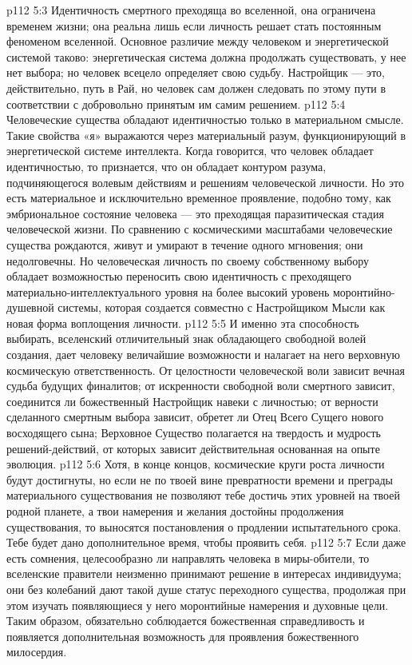 \vs p112 5:3 \pc Идентичность смертного преходяща во вселенной, она ограничена временем жизни; она реальна лишь если личность решает стать постоянным феноменом вселенной. Основное различие между человеком и энергетической системой таково: энергетическая система должна продолжать существовать, у нее нет выбора; но человек всецело определяет свою судьбу. Настройщик --- это, действительно, путь в Рай, но человек сам должен следовать по этому пути в соответствии с добровольно принятым им самим решением.
\vs p112 5:4 Человеческие существа обладают идентичностью только в материальном смысле. Такие свойства «я» выражаются через материальный разум, функционирующий в энергетической системе интеллекта. Когда говорится, что человек обладает идентичностью, то признается, что он обладает контуром разума, подчиняющегося волевым действиям и решениям человеческой личности. Но это есть материальное и исключительно временное проявление, подобно тому, как эмбриональное состояние человека --- это преходящая паразитическая стадия человеческой жизни. По сравнению с космическими масштабами человеческие существа рождаются, живут и умирают в течение одного мгновения; они недолговечны. Но человеческая личность по своему собственному выбору обладает возможностью переносить свою идентичность с преходящего материально\hyp{}интеллектуального уровня на более высокий уровень моронтийно\hyp{}душевной системы, которая создается совместно с Настройщиком Мысли как новая форма воплощения личности.
\vs p112 5:5 И именно эта способность выбирать, вселенский отличительный знак обладающего свободной волей создания, дает человеку величайшие возможности и налагает на него верховную космическую ответственность. От целостности человеческой воли зависит вечная судьба будущих финалитов; от искренности свободной воли смертного зависит, соединится ли божественный Настройщик навеки с личностью; от верности сделанного смертным выбора зависит, обретет ли Отец Всего Сущего нового восходящего сына; Верховное Существо полагается на твердость и мудрость решений\hyp{}действий, от которых зависит действительная основанная на опыте эволюция.
\vs p112 5:6 \pc Хотя, в конце концов, космические круги роста личности будут достигнуты, но если не по твоей вине превратности времени и преграды материального существования не позволяют тебе достичь этих уровней на твоей родной планете, а твои намерения и желания достойны продолжения существования, то выносятся постановления о продлении испытательного срока. Тебе будет дано дополнительное время, чтобы проявить себя.
\vs p112 5:7 Если даже есть сомнения, целесообразно ли направлять человека в миры\hyp{}обители, то вселенские правители неизменно принимают решение в интересах индивидуума; они без колебаний дают такой душе статус переходного существа, продолжая при этом изучать появляющиеся у него моронтийные намерения и духовные цели. Таким образом, обязательно соблюдается божественная справедливость и появляется дополнительная возможность для проявления божественного милосердия.

